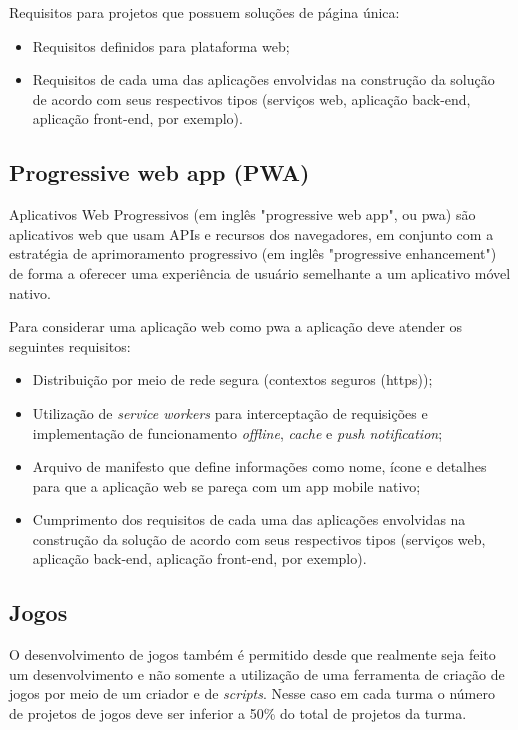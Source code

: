 Requisitos para projetos que possuem soluções de página única:
\begin{itemize}
  \item Requisitos definidos para plataforma web;
  
  \item Requisitos de cada uma das aplicações envolvidas na construção da solução de acordo com seus respectivos tipos (serviços web, aplicação back-end, aplicação front-end, por exemplo).
  
\end{itemize}


\subsection{Progressive web app (PWA)}

Aplicativos Web Progressivos (em inglês "progressive web app", ou \acs{pwa}) são aplicativos web que usam APIs e recursos dos navegadores, em conjunto com a estratégia de aprimoramento progressivo (em inglês "progressive enhancement") de forma a oferecer uma experiência de usuário semelhante a um aplicativo móvel nativo.

Para considerar uma aplicação web como \acs{pwa} a aplicação deve atender os seguintes requisitos: 

\begin{itemize}
\item Distribuição por meio de rede segura (contextos seguros (\ac{https}));

\item Utilização de \emph{service workers} para interceptação de requisições e implementação de funcionamento \emph{offline}, \emph{cache} e \emph{push notification};

\item Arquivo de manifesto que define informações como nome, ícone e detalhes para que a aplicação web se pareça com um app mobile nativo;

\item Cumprimento dos requisitos de cada uma das aplicações envolvidas na construção da solução de acordo com seus respectivos tipos (serviços web, aplicação back-end, aplicação front-end, por exemplo).

\end{itemize}
 
\subsection{Jogos}

O desenvolvimento de jogos também é permitido desde que realmente seja feito um desenvolvimento e não somente a utilização de uma ferramenta de criação de jogos por meio de um criador e de \emph{scripts}. Nesse caso em cada turma o número de projetos de jogos deve ser inferior a 50\% do total de projetos da turma.
